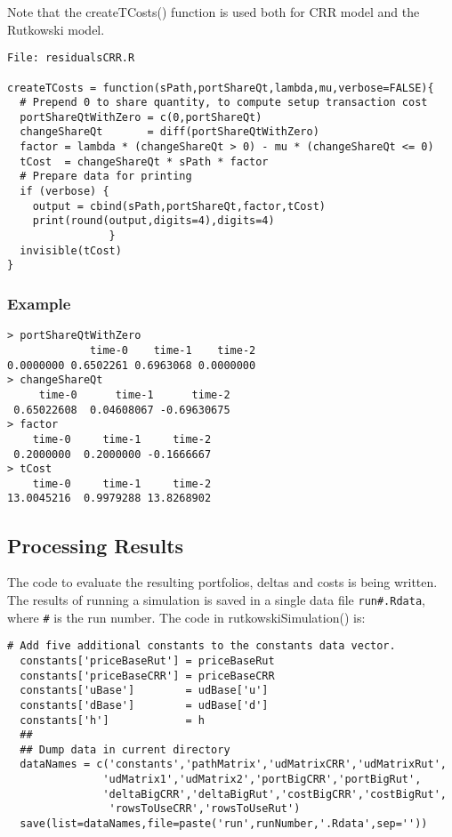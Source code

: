 \documentclass[10pt]{article}
\begin{document}
Note that the createTCosts() function is used both for CRR model and the Rutkowski model.

\begin{verbatim}
File: residualsCRR.R

createTCosts = function(sPath,portShareQt,lambda,mu,verbose=FALSE){
  # Prepend 0 to share quantity, to compute setup transaction cost
  portShareQtWithZero = c(0,portShareQt)
  changeShareQt       = diff(portShareQtWithZero)
  factor = lambda * (changeShareQt > 0) - mu * (changeShareQt <= 0)
  tCost  = changeShareQt * sPath * factor
  # Prepare data for printing
  if (verbose) {
    output = cbind(sPath,portShareQt,factor,tCost)
    print(round(output,digits=4),digits=4)
                }
  invisible(tCost)
}
\end{verbatim}

\subsubsection*{Example}

\begin{verbatim}
> portShareQtWithZero
             time-0    time-1    time-2
0.0000000 0.6502261 0.6963068 0.0000000
> changeShareQt
     time-0      time-1      time-2
 0.65022608  0.04608067 -0.69630675
> factor
    time-0     time-1     time-2
 0.2000000  0.2000000 -0.1666667
> tCost
    time-0     time-1     time-2
13.0045216  0.9979288 13.8268902
\end{verbatim}

\subsection*{Processing Results}
The code to evaluate the resulting portfolios, deltas and costs is being written.
 The results of running a simulation
is saved in a single data file \verb!run#.Rdata!, where \verb!#! is the run number.
The code in rutkowskiSimulation() is:

\begin{verbatim}
# Add five additional constants to the constants data vector.
  constants['priceBaseRut'] = priceBaseRut
  constants['priceBaseCRR'] = priceBaseCRR
  constants['uBase']        = udBase['u']
  constants['dBase']        = udBase['d']
  constants['h']            = h
  ##
  ## Dump data in current directory
  dataNames = c('constants','pathMatrix','udMatrixCRR','udMatrixRut',
               'udMatrix1','udMatrix2','portBigCRR','portBigRut',
               'deltaBigCRR','deltaBigRut','costBigCRR','costBigRut',
                'rowsToUseCRR','rowsToUseRut')
  save(list=dataNames,file=paste('run',runNumber,'.Rdata',sep=''))
\end{verbatim}
\end{document}
